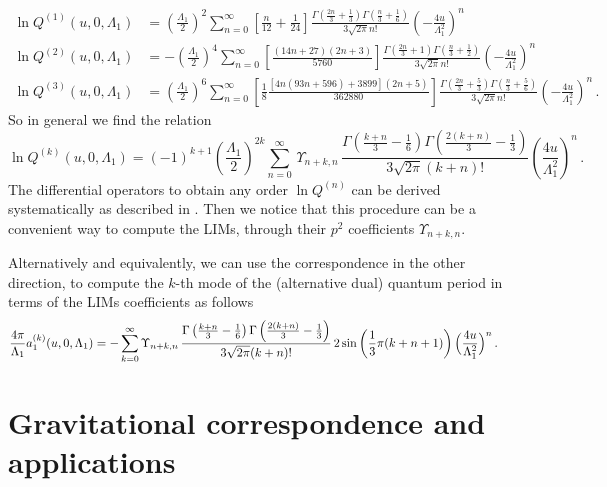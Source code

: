 \documentclass[11pt,a4paper]{elsarticle}
\newcommand{\be}{\begin{equation}}
\newcommand{\ee}{\end{equation}}
\numberwithin{figure}{section}
\numberwithin{table}{section}
\begin{document}
\begin{align}
\ln Q^{(1)}(u,0,\Lambda_1)&=  \left(\frac{\Lambda_1}{2}\right)^2 \sum _{n=0}^\infty \left [\frac{n}{12} + \frac{1}{24} \right] \frac{\Gamma \left(\frac{2n }{3}+\frac{1}{3} \right) \Gamma \left(\frac{n}{3}+\frac{1}{6}\right)}{3 \sqrt{2\pi} n!} \left(-\frac{4 u}{\Lambda_1^2}\right)^n\\
\ln Q^{(2)}(u,0,\Lambda_1)&= - \left(\frac{\Lambda_1}{2}\right)^4\sum _{n=0}^\infty \left [\frac{(14n+27)(2n+3)}{5760} \right] \frac{\Gamma \left(\frac{2n }{3}+1 \right) \Gamma \left(\frac{n}{3}+\frac{1}{2}\right)}{3 \sqrt{2\pi} n!} \left(-\frac{4 u}{\Lambda_1^2}\right)^n\\
\ln Q^{(3)}(u,0,\Lambda_1)&=  \left(\frac{\Lambda_1}{2}\right)^6\sum _{n=0}^\infty \left [\frac{1}{8}\frac{ [4 n (93 n+596)+3899](2 n+5)}{362880}\right] \frac{\Gamma \left(\frac{2n }{3}+\frac{5}{3} \right) \Gamma \left(\frac{n}{3}+\frac{5}{6}\right)}{3 \sqrt{2\pi} n!} \left(-\frac{4 u}{\Lambda_1^2}\right)^n\,.
\end{align}
So in general we find the relation
\be  \label{lnQUps}
\ln Q^{(k)}(u,0,\Lambda_1) = (-1)^{k+1} \left(\frac{\Lambda_1}{2}\right)^{2k} \sum_{n=0}^\infty \, \Upsilon_{n+k,n}\,\frac{\Gamma \left(\frac{k+n}{3}-\frac{1}{6}\right) \Gamma \left(\frac{2 (k+n)}{3}-\frac{1}{3}\right)}{3 \sqrt{2 \pi } (k+n)!}\left(\frac{4 u}{\Lambda_1^2}\right)^n\,.
\ee
The differential operators to obtain any order $\ln Q^{(n)}$ can be derived systematically as described in \cite{FioravantiGregori:2019}. Then we notice that this procedure can be a convenient way to compute the LIMs, through their $p^2$ coefficients $\Upsilon_{n+k,n}$.%

Alternatively and equivalently, we can use the correspondence in the other direction, to compute the $k$-th mode of the
(alternative dual) quantum period in terms of the LIMs coefficients as follows
\begin{align} 
\frac{4 \pi}{\Lambda_1}a^{(k)}_1(u,0,\Lambda_1) &=- \sum_{k=0}^\infty   \Upsilon_{n+k,n}\,\frac{\Gamma \left(\frac{k+n}{3}-\frac{1}{6}\right) \Gamma \left(\frac{2 (k+n)}{3}-\frac{1}{3}\right)}{3 \sqrt{2 \pi } (k+n)!}   \,2 \sin \left(\frac{1}{3} \pi  (k+n+1)\right)\Bigl( \frac{4u }{\Lambda_1^2}\Bigr)^n \label{aDnLIM1}\,.
\end{align}  

\section{Gravitational correspondence and applications} \label{gravity}
\end{document}
